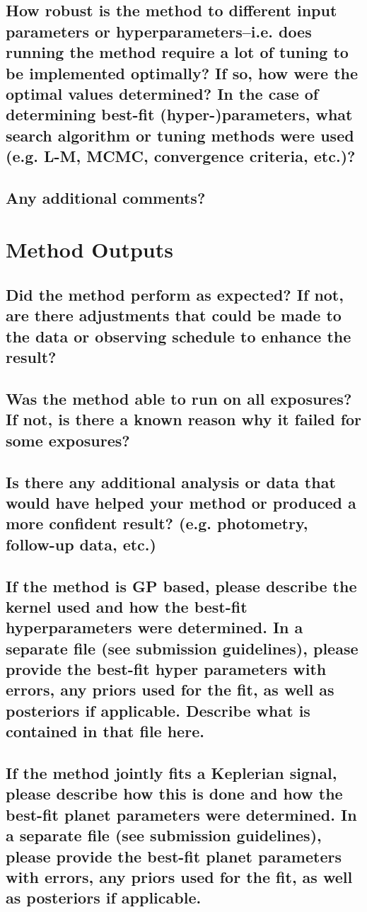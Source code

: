 \documentclass[12pt]{article}
\numberwithin{equation}{section}
\begin{document}
\subsection{How robust is the method to different input parameters or hyperparameters--i.e. does running the method require a lot of tuning to be implemented optimally?  If so, how were the optimal values determined? In the case of determining best-fit (hyper-)parameters, what search algorithm or tuning methods were used (e.g. L-M, MCMC, convergence criteria, etc.)?}

\subsection{Any additional comments?}


\section{Method Outputs}
\subsection{Did the method perform as expected?  If not, are there adjustments that could be made to the data or observing schedule to enhance the result?}

\subsection{Was the method able to run on all exposures?  If not, is there a known reason why it failed for some exposures?}

\subsection{Is there any additional analysis or data that would have helped your method or produced a more confident result?  (e.g. photometry, follow-up data, etc.)}

\subsection{If the method is GP based, please describe the kernel used and how the best-fit hyperparameters were determined.   In a separate file (see submission guidelines), please provide the best-fit hyper parameters with errors, any priors used for the fit, as well as posteriors if applicable.  Describe what is contained in that file here.}

\subsection{If the method jointly fits a Keplerian signal, please describe how this is done and how the best-fit planet parameters were determined.  In a separate file (see submission guidelines), please provide the best-fit planet parameters with errors, any priors used for the fit, as well as posteriors if applicable.}
\end{document}
